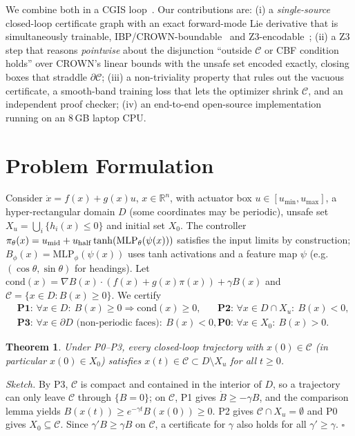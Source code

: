 \documentclass[10pt]{article}
\newtheorem{theorem}{Theorem}
\newcommand{\C}{\mathcal{C}}
\newcommand{\cond}{\mathrm{cond}}
\begin{document}
We combine both in a CGIS loop~\cite{solarlezama2006sketching}. Our contributions are: (i) a \emph{single-source} closed-loop certificate graph with an exact forward-mode Lie derivative that is simultaneously trainable, IBP/CROWN-boundable~\cite{gowal2018ibp,zhang2018crown,xu2020autolirpa} and Z3-encodable~\cite{demoura2008z3}; (ii) a Z3 step that reasons \emph{pointwise} about the disjunction ``outside $\C$ or CBF condition holds'' over CROWN's linear bounds with the unsafe set encoded exactly, closing boxes that straddle $\partial\C$; (iii) a non-triviality property that rules out the vacuous certificate, a smooth-band training loss that lets the optimizer shrink $\C$, and an independent proof checker; (iv) an end-to-end open-source implementation running on an 8\,GB laptop CPU.

\section{Problem Formulation}
Consider $\dot x=f(x)+g(x)u$, $x\in\mathbb R^n$, with actuator box $u\in[u_{\min},u_{\max}]$, a hyper-rectangular domain $D$ (some coordinates may be periodic), unsafe set $X_u=\bigcup_i\{h_i(x)\le 0\}$ and initial set $X_0$. The controller $\pi_\theta(x)=u_{\rm mid}+u_{\rm half}\tanh(\mathrm{MLP}_\theta(\psi(x)))$ satisfies the input limits by construction; $B_\phi(x)=\mathrm{MLP}_\phi(\psi(x))$ uses tanh activations and a feature map $\psi$ (e.g.\ $(\cos\theta,\sin\theta)$ for headings). Let $\cond(x)=\nabla B(x)\cdot(f(x)+g(x)\pi(x))+\gamma B(x)$ and $\C=\{x\in D:B(x)\ge 0\}$. We certify
\begin{align*}
&\textbf{P1: } \forall x\in D:\ B(x)\ge 0\Rightarrow \cond(x)\ge 0, &&\textbf{P2: } \forall x\in D\cap X_u:\ B(x)<0,\\
&\textbf{P3: } \forall x\in\partial D \text{ (non-periodic faces)}:\ B(x)<0, &&\textbf{P0: } \forall x\in X_0:\ B(x)>0.
\end{align*}
\begin{theorem}
Under P0--P3, every closed-loop trajectory with $x(0)\in \C$ (in particular $x(0)\in X_0$) satisfies $x(t)\in\C\subset D\setminus X_u$ for all $t\ge 0$.
\end{theorem}
\noindent\emph{Sketch.} By P3, $\C$ is compact and contained in the interior of $D$, so a trajectory can only leave $\C$ through $\{B=0\}$; on $\C$, P1 gives $\dot B\ge-\gamma B$, and the comparison lemma yields $B(x(t))\ge e^{-\gamma t}B(x(0))\ge 0$. P2 gives $\C\cap X_u=\emptyset$ and P0 gives $X_0\subseteq\C$. Since $\gamma' B\ge\gamma B$ on $\C$, a certificate for $\gamma$ also holds for all $\gamma'\ge\gamma$. \hfill$\square$
\end{document}
